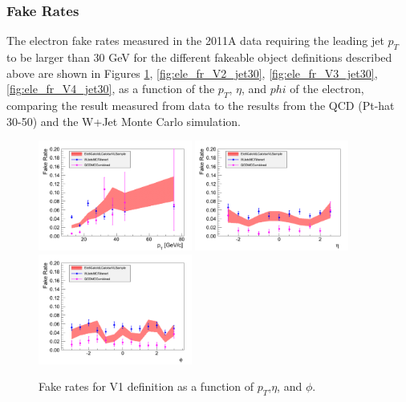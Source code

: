 \subsubsection{Fake Rates}
The electron fake rates measured in the 2011A data requiring the leading jet $p_{T}$ to be 
larger than $30$ GeV for the different fakeable object 
definitions described above are shown in Figures \ref{fig:ele_fr_V1_jet30},
\ref{fig:ele_fr_V2_jet30}, \ref{fig:ele_fr_V3_jet30}, \ref{fig:ele_fr_V4_jet30}, as a function of the 
$p_{T}$, $\eta$, and $phi$ of the electron, comparing the result measured from data to the
results from the QCD (Pt-hat 30-50) and the W+Jet Monte Carlo simulation.

\begin{figure}[!htbp]
\begin{center}
\includegraphics[width=0.45\textwidth]{figures/ElectronFakeRate_DenominatorV1_ptThreshold30_Pt.pdf}
\includegraphics[width=0.45\textwidth]{figures/ElectronFakeRate_DenominatorV1_ptThreshold30_Eta.pdf}
\includegraphics[width=0.45\textwidth]{figures/ElectronFakeRate_DenominatorV1_ptThreshold30_Phi.pdf}
\caption{Fake rates for V1 definition as a function of $p_T$,$\eta$, and $\phi$.}
\label{fig:ele_fr_V1_jet30}
\end{center}
\end{figure}


